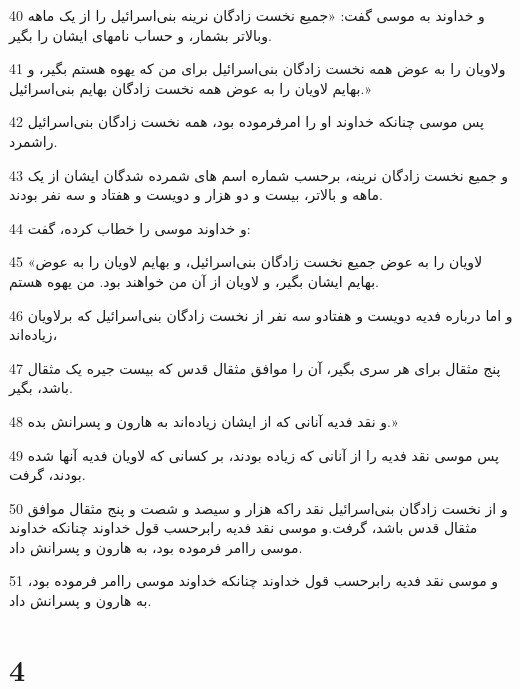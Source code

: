 \par 40 و خداوند به موسی گفت: «جمیع نخست زادگان نرینه بنی‌اسرائیل را از یک ماهه وبالاتر بشمار، و حساب نامهای ایشان را بگیر.
\par 41 ولاویان را به عوض همه نخست زادگان بنی‌اسرائیل برای من که یهوه هستم بگیر، و بهایم لاویان را به عوض همه نخست زادگان بهایم بنی‌اسرائیل.»
\par 42 پس موسی چنانکه خداوند او را امرفرموده بود، همه نخست زادگان بنی‌اسرائیل راشمرد.
\par 43 و جمیع نخست زادگان نرینه، برحسب شماره اسم های شمرده شدگان ایشان از یک ماهه و بالاتر، بیست و دو هزار و دویست و هفتاد و سه نفر بودند.
\par 44 و خداوند موسی را خطاب کرده، گفت:
\par 45 «لاویان را به عوض جمیع نخست زادگان بنی‌اسرائیل، و بهایم لاویان را به عوض بهایم ایشان بگیر، و لاویان از آن من خواهند بود. من یهوه هستم.
\par 46 و اما درباره فدیه دویست و هفتادو سه نفر از نخست زادگان بنی‌اسرائیل که برلاویان زیاده‌اند،
\par 47 پنج مثقال برای هر سری بگیر، آن را موافق مثقال قدس که بیست جیره یک مثقال باشد، بگیر.
\par 48 و نقد فدیه آنانی که از ایشان زیاده‌اند به هارون و پسرانش بده.»
\par 49 پس موسی نقد فدیه را از آنانی که زیاده بودند، بر کسانی که لاویان فدیه آنها شده بودند، گرفت.
\par 50 و از نخست زادگان بنی‌اسرائیل نقد راکه هزار و سیصد و شصت و پنج مثقال موافق مثقال قدس باشد، گرفت.و موسی نقد فدیه رابرحسب قول خداوند چنانکه خداوند موسی راامر فرموده بود، به هارون و پسرانش داد.
\par 51 و موسی نقد فدیه رابرحسب قول خداوند چنانکه خداوند موسی راامر فرموده بود، به هارون و پسرانش داد.
 
\chapter{4}

